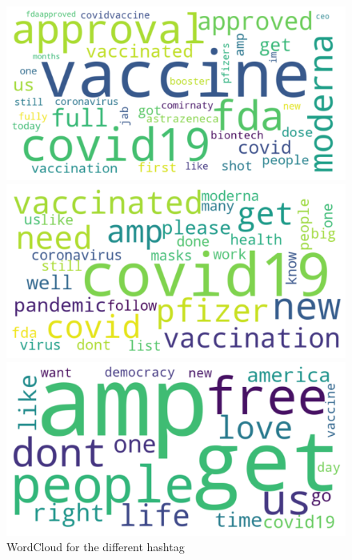 \documentclass[12pt,%
               a4paper,%
               oneside,openany,%
               titlepage,%
               headinclude,footinclude,%
               BCOR5mm,%
               cleardoublepage=empty,%
               tablecaptionabove,%
               floatperchapter,
               ]{scrreprt}                 %
\begin{document}
\begin{figure}[ht]
\begin{minipage}[b]{0.5\linewidth}
    \vspace{4ex}
  \end{minipage}
    \begin{minipage}[b]{0.5\linewidth}
    \centering
    \includegraphics[width=.9\linewidth]{Figures/WordCloud_pfizer.png}
    \vspace{4ex}
  \end{minipage}
  \begin{minipage}[b]{0.5\linewidth}
    \centering
    \includegraphics[width=.9\linewidth]{Figures/WordCloud_Vaccine.png}
    \vspace{4ex}
  \end{minipage}
     \begin{minipage}[b]{0.5\linewidth}
    \centering
    \includegraphics[width=.9\linewidth]{Figures/WordCloud_Freedom.png}
    \vspace{4ex}
  \end{minipage}
\caption{WordCloud for the different hashtag}
\label{WordCloud_ALL}
\end{figure}
\end{document}
